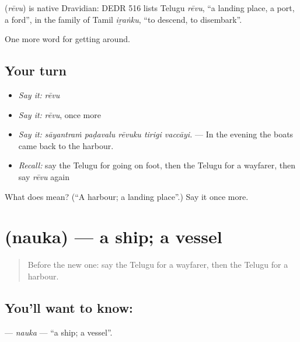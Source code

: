 \begin{cousinweb}
\textbf{} (\emph{rēvu}) is native Dravidian: DEDR 516 lists Telugu \emph{rēvu}, \textquotedblleft{}a landing place, a port, a ford\textquotedblright{}, in the family of Tamil \emph{iṟaṅku}, \textquotedblleft{}to descend, to disembark\textquotedblright{}.
\end{cousinweb}

\begin{grammarlens}[title={What you've built}]
One more word for getting around.
\end{grammarlens}

\subsection*{Your turn}
\begin{itemize}
\raggedright
  \item \emph{Say it:} \emph{rēvu}
  \item \emph{Say it:} \emph{rēvu}, once more
  \item \emph{Say it:} \emph{sāyantraṁ paḍavalu rēvuku tirigi vaccāyi.} — In the evening the boats came back to the harbour.
  \item \emph{Recall:} say the Telugu for going on foot, then the Telugu for a wayfarer, then say \emph{rēvu} again
\end{itemize}

\begin{tcolorbox}[breakable,colback=teal!4,colframe=teal!35!black,title={Before you move on}]
What does  mean? (\textquotedblleft{}A harbour; a landing place\textquotedblright{}.) Say it once more.
\end{tcolorbox}
\section[\texorpdfstring{\te{నౌక} (nauka)}{నౌక (nauka)}]{ (nauka) — a ship; a vessel}

\label{lesson:TE-C452-nauka}



\begin{quote}
Before the new one: say the Telugu for a wayfarer, then the Telugu for a harbour.
\end{quote}

\subsection*{You'll want to know: }
\textbf{} — \emph{nauka} — \textquotedblleft{}a ship; a vessel\textquotedblright{}.

